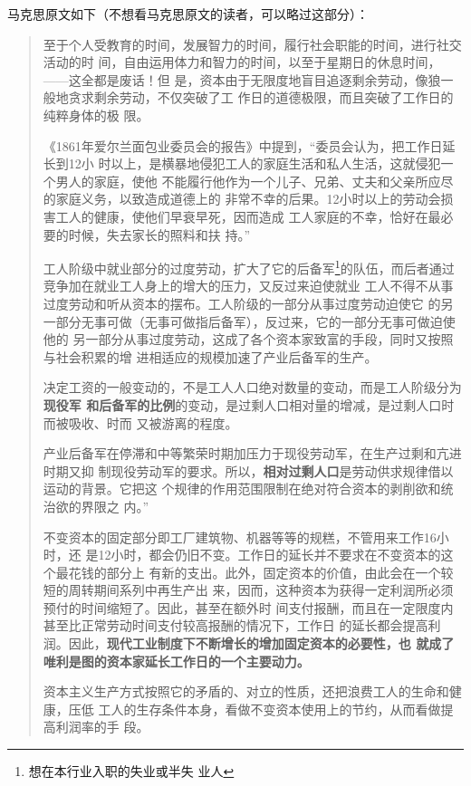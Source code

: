 马克思原文如下（不想看马克思原文的读者，可以略过这部分）：
\begin{quotation}
  至于个人受教育的时间，发展智力的时间，履行社会职能的时间，进行社交活动的时
  间，自由运用体力和智力的时间，以至于星期日的休息时间，——这全都是废话！但
  是，资本由于无限度地盲目追逐剩余劳动，像狼一般地贪求剩余劳动，不仅突破了工
  作日的道德极限，而且突破了工作日的纯粹身体的极
  限。

  《1861年爱尔兰面包业委员会的报告》中提到，“委员会认为，把工作日延长到12小
  时以上，是横暴地侵犯工人的家庭生活和私人生活，这就侵犯一个男人的家庭，使他
  不能履行他作为一个儿子、兄弟、丈夫和父亲所应尽的家庭义务，以致造成道德上的
  非常不幸的后果。12小时以上的劳动会损害工人的健康，使他们早衰早死，因而造成
  工人家庭的不幸，恰好在最必要的时候，失去家长的照料和扶
  持。”

  工人阶级中就业部分的过度劳动，扩大了它的后备军\footnote{想在本行业入职的失业或半失
    业人}的队伍，而后者通过竞争加在就业工人身上的增大的压力，又反过来迫使就业
  工人不得不从事过度劳动和听从资本的摆布。工人阶级的一部分从事过度劳动迫使它
  的另一部分无事可做（无事可做指后备军），反过来，它的一部分无事可做迫使他的
  另一部分从事过度劳动，这成了各个资本家致富的手段，同时又按照与社会积累的增
  进相适应的规模加速了产业后备军的生产。

  决定工资的一般变动的，不是工人人口绝对数量的变动，而是工人阶级分为\textbf{现役军
    和后备军的比例}的变动，是过剩人口相对量的增减，是过剩人口时而被吸收、时而
  又被游离的程度。

  产业后备军在停滞和中等繁荣时期加压力于现役劳动军，在生产过剩和亢进时期又抑
  制现役劳动军的要求。所以，\textbf{相对过剩人口}是劳动供求规律借以运动的背景。它把这
  个规律的作用范围限制在绝对符合资本的剥削欲和统治欲的界限之
  内。”

  不变资本的固定部分即工厂建筑物、机器等等的规糕，不管用来工作16小时，还
  是12小时，都会仍旧不变。工作日的延长并不要求在不变资本的这个最花钱的部分上
  有新的支出。此外，固定资本的价值，由此会在一个较短的周转期间系列中再生产出
  来，因而，这种资本为获得一定利润所必须预付的时间缩短了。因此，甚至在额外时
  间支付报酬，而且在一定限度内甚至比正常劳动时间支付较高报酬的情况下，工作日
  的延长都会提高利润。因此，\textbf{现代工业制度下不断增长的增加固定资本的必要性，也
  就成了唯利是图的资本家延长工作日的一个主要动力。}

  资本主义生产方式按照它的矛盾的、对立的性质，还把浪费工人的生命和健康，压低
  工人的生存条件本身，看做不变资本使用上的节约，从而看做提高利润率的手
  段。
\end{quotation}

